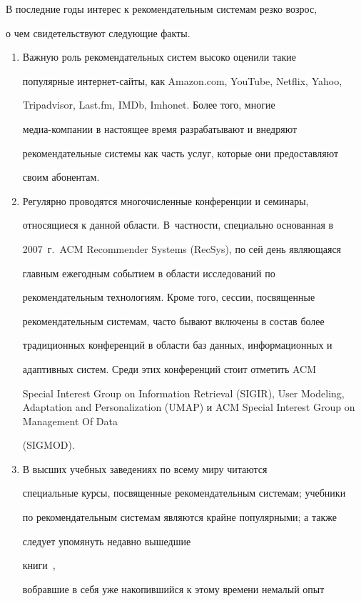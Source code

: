 В последние годы интерес к рекомендательным системам резко возрос,


о чем свидетельствуют следующие факты.


\begin{enumerate}[1.]


\item Важную роль рекомендательных систем высоко оценили такие


популярные интернет-сайты, как Amazon.com, YouTube, Netflix, Yahoo,


Tripadvisor, Last.fm, IMDb, Imhonet.  Более того, многие


ме\-диа-ком\-па\-нии в настоящее время разрабатывают и внедряют


рекомендательные системы как часть услуг, которые они предоставляют


своим абонентам.


\item Регулярно проводятся многочисленные конференции и семинары,


относящиеся к данной области. В~частности, специально основанная в


2007~г.\ ACM Recommender Systems (RecSys), по сей день являющаяся


главным ежегодным событием в области исследований по


рекомендательным технологиям. Кроме того, сессии, посвященные


рекомендательным системам, часто бывают включены в состав более


традиционных конференций в области баз данных, информационных и


адаптивных систем. Среди этих конференций стоит отметить ACM 


Special Interest Group on Information Retrieval (SIGIR), User Modeling, Adaptation and Personalization (UMAP) и ACM Special Interest Group on Management Of Data


 (SIGMOD).


\item В высших учебных заведениях по всему миру читаются


специальные курсы, посвященные рекомендательным системам; учебники


по рекомендательным системам являются крайне популярными; а также


следует упомянуть недавно вышедшие


книги~\cite{jannach2010recommender, ricci2010recommender},


вобравшие в себя уже накопившийся к этому времени немалый опыт



\end{enumerate}
